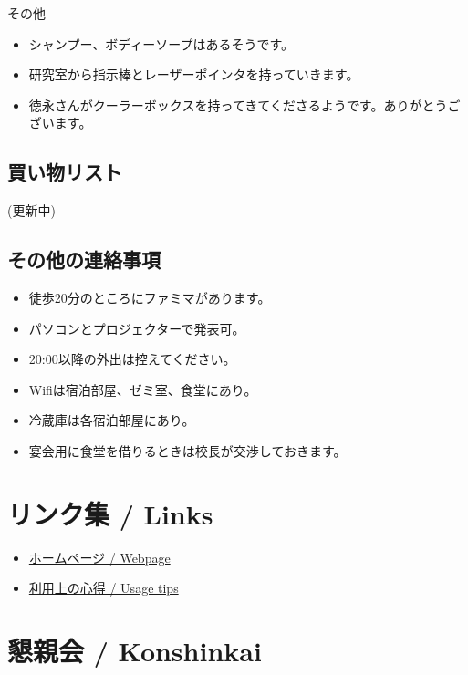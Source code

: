 \documentclass[unicode,a4paper,11pt]{ltjsarticle}
\begin{document}
その他

\begin{itemize}
  \item
        シャンプー、ボディーソープはあるそうです。
  \item
        研究室から指示棒とレーザーポインタを持っていきます。
  \item
        徳永さんがクーラーボックスを持ってきてくださるようです。ありがとうございます。
\end{itemize}

\subsection*{買い物リスト}

(更新中)

\subsection*{その他の連絡事項}

\begin{itemize}
  \item
        徒歩20分のところにファミマがあります。
  \item
        パソコンとプロジェクターで発表可。
  \item
        20:00以降の外出は控えてください。
  \item
        Wifiは宿泊部屋、ゼミ室、食堂にあり。
  \item
        冷蔵庫は各宿泊部屋にあり。
  \item
        宴会用に食堂を借りるときは校長が交渉しておきます。
\end{itemize}


\section{リンク集 / Links}

\begin{itemize}
  \item
        \href{https://www.waseda.jp/inst/student/facility/seminar/facility/izukawana}{ホームページ / Webpage}
  \item
        \href{https://www.waseda.jp/inst/student/facility/seminar/flow/tips}{利用上の心得 / Usage tips}
\end{itemize}


\section{懇親会 / Konshinkai}
\end{document}
